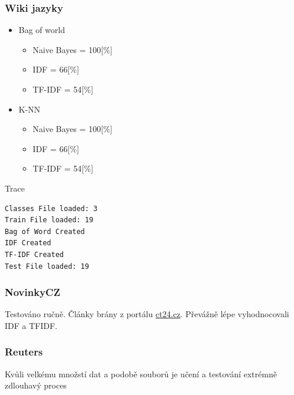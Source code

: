 \documentclass[a4paper,12pt]{article}
\begin{document}
\subsubsection{Wiki jazyky}
\begin{itemize}
    \item Bag of world 
\begin{itemize}
    \item Naive Bayes = 100[\%]
    \item IDF = 66[\%]
    \item TF-IDF = 54[\%]
\end{itemize}
    \item K-NN 
\begin{itemize}
    \item Naive Bayes = 100[\%]
    \item IDF = 66[\%]
    \item TF-IDF = 54[\%]
\end{itemize}
\end{itemize}
Trace
\begin{lstlisting}[language=bash]
Classes File loaded: 3
Train File loaded: 19
Bag of Word Created
IDF Created
TF-IDF Created
Test File loaded: 19
\end{lstlisting}
\subsubsection{NovinkyCZ}
Testováno ručně. Články brány z portálu \url{ct24.cz}. Převážně lépe vyhodnocovali IDF a TFIDF.
\subsubsection{Reuters}
Kvůli velkému množstí dat a podobě souborů je učení a testování extrémně zdlouhavý proces
\end{document}
